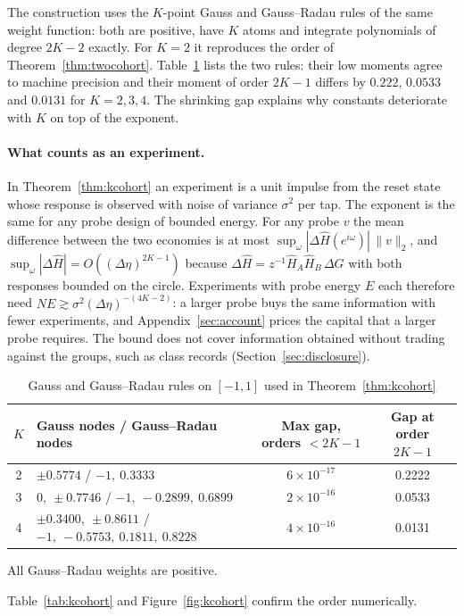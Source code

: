 \documentclass[12pt]{article}
\theoremstyle{definition}
\theoremstyle{remark}
\begin{document}
The construction uses the $K$-point Gauss and Gauss--Radau rules of the same weight function: both are positive, have $K$ atoms and integrate polynomials of degree $2K-2$ exactly. For $K=2$ it reproduces the order of Theorem~\ref{thm:twocohort}. Table~\ref{tab:radau} lists the two rules: their low moments agree to machine precision and their moment of order $2K-1$ differs by $0.222$, $0.0533$ and $0.0131$ for $K=2,3,4$. The shrinking gap explains why constants deteriorate with $K$ on top of the exponent.

\paragraph{What counts as an experiment.} In Theorem~\ref{thm:kcohort} an experiment is a unit impulse from the reset state whose response is observed with noise of variance $\sigma^2$ per tap. The exponent is the same for any probe design of bounded energy. For any probe $v$ the mean difference between the two economies is at most $\sup_\omega|\Delta\hat H(e^{i\omega})|\,\|v\|_2$, and $\sup_\omega|\Delta\hat H|=O((\Delta\eta)^{2K-1})$ because $\Delta\hat H=z^{-1}\hat H_A\hat H_B\,\Delta G$ with both responses bounded on the circle. Experiments with probe energy $E$ each therefore need $NE\gtrsim\sigma^2(\Delta\eta)^{-(4K-2)}$: a larger probe buys the same information with fewer experiments, and Appendix~\ref{sec:account} prices the capital that a larger probe requires. The bound does not cover information obtained without trading against the groups, such as class records (Section~\ref{sec:disclosure}).

\begin{table}[t]\centering\small
\begin{threeparttable}
\caption{Gauss and Gauss--Radau rules on $[-1,1]$ used in Theorem~\ref{thm:kcohort}}\label{tab:radau}
\begin{tabular}{cp{}cc}
\toprule
$K$ & Gauss nodes / Gauss--Radau nodes & Max gap, orders $<2K-1$ & Gap at order $2K-1$\\
\midrule
2 & $\pm0.5774$ \;/\; $-1,\ 0.3333$ & $6\times10^{-17}$ & 0.2222\\
3 & $0,\ \pm0.7746$ \;/\; $-1,\ -0.2899,\ 0.6899$ & $2\times10^{-16}$ & 0.0533\\
4 & $\pm0.3400,\ \pm0.8611$ \;/\; $-1,\ -0.5753,\ 0.1811,\ 0.8228$ & $4\times10^{-16}$ & 0.0131\\
\bottomrule
\end{tabular}
\begin{tablenotes}\footnotesize\item All Gauss--Radau weights are positive. \end{tablenotes}
\end{threeparttable}
\end{table} Table~\ref{tab:kcohort} and Figure~\ref{fig:kcohort} confirm the order numerically.
\end{document}
